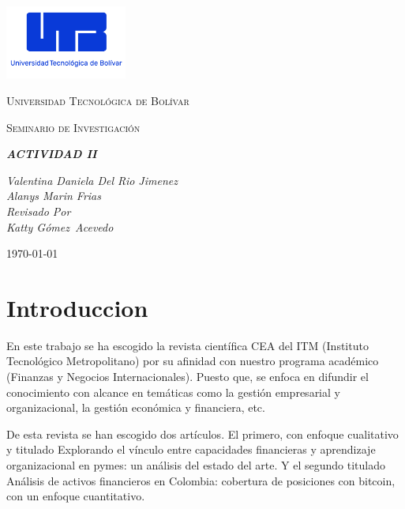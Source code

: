 \documentclass[letterpaper, 12pt]{report}
\begin{document}
\begin{titlepage}
      \centering
      \includegraphics[width=0.3\textwidth]{Images/logo_utb.png}\par\vspace{1cm}
      {\scshape\LARGE Universidad Tecnológica de Bolívar \par}
      \vspace{1cm}

      {\scshape\Large Seminario de Investigación \par}
      \vspace{1cm}

      \slshape {\Large \bfseries{}ACTIVIDAD II\\}
      \vspace{2cm}

      \slshape {\itshape{} Valentina Daniela Del Rio Jimenez \\}
      \slshape {\itshape{} Alanys Marin Frias \\}
      \vfill
      Revisado Por \\
      Katty Gómez Acevedo\\
      {\large \today\par}
\end{titlepage}

\nocite{*}

\section*{Introduccion}

En este trabajo se ha escogido la revista científica CEA del ITM (Instituto
Tecnológico Metropolitano) por su afinidad con nuestro programa académico
(Finanzas y Negocios Internacionales). Puesto que, se enfoca en difundir el
conocimiento con alcance en temáticas como la gestión empresarial y
organizacional, la gestión económica y financiera, etc.

De esta revista se han escogido dos artículos. El primero, con enfoque
cualitativo y titulado Explorando el vínculo entre capacidades financieras y
aprendizaje organizacional en pymes: un análisis del estado del arte. Y el
segundo titulado Análisis de activos financieros en Colombia: cobertura de
posiciones con bitcoin, con un enfoque cuantitativo.
\end{document}
